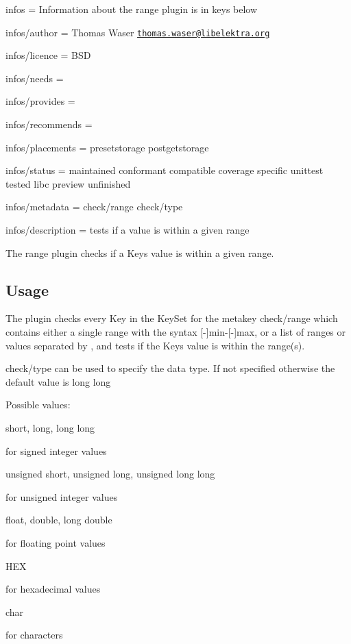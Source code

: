 
\begin{DoxyItemize}
\item infos = Information about the range plugin is in keys below
\item infos/author = Thomas Waser \href{mailto:thomas.waser@libelektra.org}{\tt thomas.\+waser@libelektra.\+org}
\item infos/licence = B\+SD
\item infos/needs =
\item infos/provides =
\item infos/recommends =
\item infos/placements = presetstorage postgetstorage
\item infos/status = maintained conformant compatible coverage specific unittest tested libc preview unfinished
\item infos/metadata = check/range check/type
\item infos/description = tests if a value is within a given range
\end{DoxyItemize}

The range plugin checks if a {\ttfamily Key}\textquotesingle{}s value is within a given range.

\subsection*{Usage}

The plugin checks every {\ttfamily Key} in the {\ttfamily Key\+Set} for the metakey {\ttfamily check/range} which contains either a single range with the syntax {\ttfamily \mbox{[}-\/\mbox{]}min-\/\mbox{[}-\/\mbox{]}max}, or a list of ranges or values separated by {\ttfamily ,} and tests if the {\ttfamily Key}\textquotesingle{}s value is within the range(s).

{\ttfamily check/type} can be used to specify the data type. If not specified otherwise the default value is {\ttfamily long long}

Possible values\+:


\begin{DoxyItemize}
\item {\ttfamily short}, {\ttfamily long}, {\ttfamily long long}

for signed integer values
\item {\ttfamily unsigned short}, {\ttfamily unsigned long}, {\ttfamily unsigned long long}

for unsigned integer values
\item {\ttfamily float}, {\ttfamily double}, {\ttfamily long double}

for floating point values
\item {\ttfamily H\+EX}

for hexadecimal values
\item {\ttfamily char}

for characters
\end{DoxyItemize}

